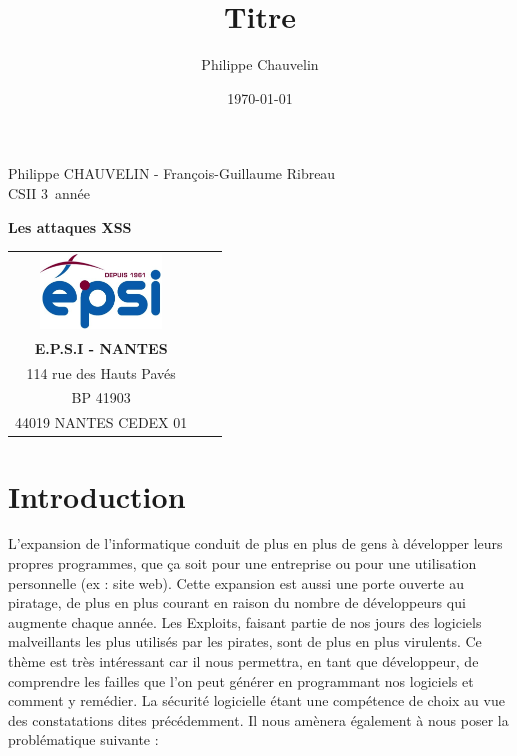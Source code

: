 \documentclass[a4paper,12pt]{report}
\title{Titre}
\author{Philippe Chauvelin}
\date{\today}
\begin{document}
	\begin{titlepage}
		\begin{center}
			Philippe CHAUVELIN - François-Guillaume Ribreau\\
			CSII 3\ieme~année\\
		\end{center}
		\hrulefill
		\vspace{7cm}
		\begin{center} 
			\LARGE \textbf{Les attaques XSS}\\
			\vspace{6cm}
		
			\begin{tabular}{cp{4cm}c}
				\includegraphics[height=75px]{images/logo_epsi.jpg}\\
				\textbf{E.P.S.I - NANTES}\\
				114 rue des Hauts Pavés\\
				BP 41903\\
				44019 NANTES CEDEX 01\\
			\end{tabular}
		\end{center}
	\end{titlepage}
	\newpage
	
	\newpage
	\null
	\thispagestyle{empty}
	\setcounter{page}{0}
	\newpage
	
	
	\setcounter{page}{1}
	\thispagestyle{empty}
	\newpage
	
	\chapter*{Introduction} %
		\setcounter{section}{1}
		
		

L’expansion de l’informatique conduit de plus en plus de gens à développer leurs propres programmes, que ça soit pour une entreprise ou pour une utilisation personnelle (ex : site web). Cette expansion est aussi une porte ouverte au piratage, de plus en plus courant en raison du nombre de développeurs qui augmente chaque année. Les Exploits, faisant partie de nos jours des logiciels malveillants les plus utilisés par les pirates, sont de plus en plus virulents.
Ce thème est très intéressant car il nous permettra, en tant que développeur, de comprendre les failles que l’on peut générer en programmant nos logiciels et comment y remédier. La sécurité logicielle étant une compétence de choix au vue des constatations dites précédemment. Il nous amènera également à nous poser la problématique suivante :
\end{document}
